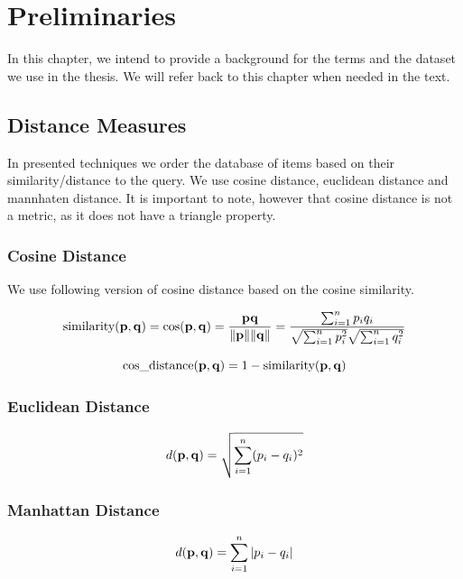 

\chapter{Preliminaries}
\label{ch:preliminaries}

In this chapter, we intend to provide a background for the terms and the dataset we use in the thesis. We will refer back to this chapter when needed in the text. 

\section{Distance Measures}

In presented techniques we order the database of items based on their similarity/distance to the query. We use cosine distance, euclidean distance and mannhaten distance. It is important to note, however that cosine distance is not a metric, as it does not have a triangle property.

\subsection{Cosine Distance}

We use following version of cosine distance based on the cosine similarity.

\begin{equation}
\text{similarity}({\bf p},{\bf q}) = \cos ({\bf p},{\bf q})= {{\bf p} {\bf q} \over \|{\bf p}\| \|{\bf q}\|} = \frac{ \sum_{i=1}^{n}{p_i q_i} }{ \sqrt{\sum_{i=1}^{n}{p_i^2}} \sqrt{\sum_{i=1}^{n}{q_i^2}} }
\end{equation}

\begin{equation}
    \text{cos\_distance}({\bf p},{\bf q}) = 1 - \text{similarity}({\bf p},{\bf q})
\end{equation}

\subsection{Euclidean Distance}
\begin{equation}
d({\bf p},{\bf q}) = \sqrt{\sum_{i=1}^n (p_i - q_i)^2}    
\end{equation}

\subsection{Manhattan Distance}
\begin{equation}
d({\bf p},{\bf q}) = {\sum_{i=1}^n |p_i - q_i|}    
\end{equation}


